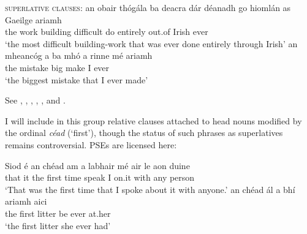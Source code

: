 \documentclass[output=paper,colorlinks,citecolor=brown]{langscibook}
\begin{document}
\ea
\textsc{superlative clauses}:
\ea
\gll an obair thógála ba deacra dár déanadh {go hiomlán} as Gaeilge ariamh \\
     the work {building\gen} {\cop} {difficult\er} {\go} {do\pastaut} entirely out.of Irish ever \\
\glt `the most difficult building-work that was ever done entirely through Irish'
\ex
\gll an mheancóg a ba mhó a rinne mé ariamh \\
     the mistake {\aLgloss} {\ba} {big\er} {\aLgloss} {make\past} I ever \\
\glt `the biggest mistake that I ever made'
\z
\z


\noindent See \citet{hoeksema:83}, \citet{von-fintel:99}, \citet{gajewski:10}, \citet{sharvit-herdan:06}, \citet{bumford-sharvit:22}, and \citet{howard:14}. 

I will include in this group relative clauses attached to head nouns modified by the ordinal \textit{céad} (`first'), though the status of such phrases as superlatives remains controversial. PSEs are licensed here:

\ea
\ea
\gll Siod é an chéad am a labhair mé air le aon duine \\
     that it the first time {\C} {speak\past} I on.it with any person \\
\glt `That was the first time that I spoke about it with anyone.'
\ex
\gll an chéad ál a bhí ariamh aici \\
     the first litter {\C} {be\past} ever at.her \\
\glt `the first litter she ever had'
\z
\z

\end{document}
